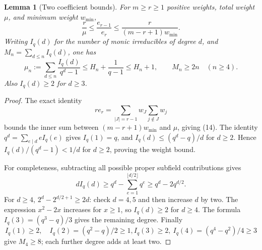 \documentclass[11pt]{article}
\newtheorem{lemma}[theorem]{Lemma}
\begin{document}
\begin{lemma}[Two coefficient bounds]\label{lem:ratioBounds}
For \(m\geq r\geq1\) positive weights, total weight \(\mu\), and
minimum weight \(w_{\min}\),
\[
 \frac r\mu\leq\frac{e_{r-1}}{e_r}
      \leq\frac r{(m-r+1)w_{\min}}.                 \tag{14}
\]
Writing \(I_q(d)\) for the number of monic irreducibles of degree \(d\),
and \(M_n=\sum_{d\leq n}I_q(d)\), one has
\[
 \mu_n:=\sum_{d\leq n}\frac{I_q(d)}{q^d-1}
      \leq H_n+\frac1{q-1}\leq H_n+1,\qquad
 M_n\geq2n\quad(n\geq4).                           \tag{15}
\]
Also \(I_q(d)\geq2\) for \(d\geq3\).
\end{lemma}
\begin{proof}
The exact identity
\[
 r e_r=\sum_{|J|=r-1}w_J\sum_{j\notin J}w_j
\]
bounds the inner sum between \((m-r+1)w_{\min}\) and \(\mu\),
giving (14). The identity \(q^d=\sum_{e\mid d}eI_q(e)\) gives
\(I_q(1)=q\), and \(I_q(d)\leq(q^d-q)/d\) for \(d\geq2\).
Hence \(I_q(d)/(q^d-1)<1/d\) for \(d\geq2\), proving the
weight bound.

For completeness, subtracting all possible proper subfield contributions
gives
\[
 d I_q(d)\geq q^d-\sum_{e=1}^{\lfloor d/2\rfloor}q^e
            \geq q^d-2q^{d/2}.
\]
For \(d\geq4\), \(2^d-2^{d/2+1}\geq2d\): check \(d=4,5\)
and then increase \(d\) by two. The expression \(x^2-2x\) increases
for \(x\geq1\), so \(I_q(d)\geq2\) for \(d\geq4\).
The formula \(I_q(3)=(q^3-q)/3\) gives the remaining degree.
Finally
\[
 I_q(1)\geq2,\quad I_q(2)=(q^2-q)/2\geq1,
 I_q(3)\geq2,\ I_q(4)=(q^4-q^2)/4\geq3
\]
give \(M_4\geq8\); each further degree adds at least two.
\end{proof}
\end{document}
